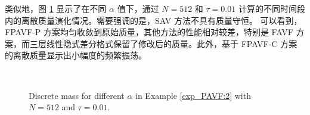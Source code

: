	类似地，图 \ref{fig_PAVF:4} 显示了在不同 $\alpha$ 值下，通过 $N=512$ 和 $\tau=0.01$ 计算的不同时间段内的离散质量演化情况。需要强调的是，SAV 方法不具有质量守恒。
可以看到，FPAVF-P 方案均匀收敛到原始质量，其他方法的性能相对较差，特别是 FAVF 方案，而三层线性隐式差分格式保留了修改后的质量。此外，基于 FPAVF-C 方案的离散质量显示出小幅度的频繁振荡。


\begin{figure}[H]
	\begin{center}
	 \\
	 \caption{Discrete mass for different $\alpha$ in Example \ref{exp_PAVF:2} with $N = 512$ and $\tau=0.01$.} \label{fig_PAVF:4}
	\end{center}
	\end{figure}

